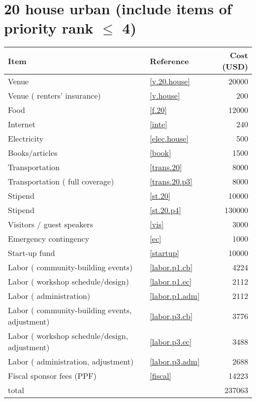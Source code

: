 \section*{20 house urban (include items of priority rank $\leq$ 4)}
\begin{center}
\begin{tabular}{llr}
Item & Reference & Cost (USD) \\ \hline
Venue & \ref{v.20.house} & 20000 \\
Venue ( renters' insurance) & \ref{v.house} & 200 \\
Food & \ref{f.20} & 12000 \\
Internet & \ref{inte} & 240 \\
Electricity & \ref{elec.house} & 500 \\
Books/articles & \ref{book} & 1500 \\
Transportation & \ref{trans.20} & 8000 \\
Transportation ( full coverage) & \ref{trans.20.p3} & 8000 \\
Stipend & \ref{st.20} & 10000 \\
Stipend & \ref{st.20.p4} & 130000 \\
Visitors / guest speakers & \ref{vis} & 3000 \\
Emergency contingency & \ref{ec} & 1000 \\
Start-up fund & \ref{startup} & 10000 \\
Labor ( community-building events) & \ref{labor.p1.cb} & 4224 \\
Labor ( workshop schedule/design) & \ref{labor.p1.ec} & 2112 \\
Labor ( administration) & \ref{labor.p1.adm} & 2112 \\
Labor ( community-building events, adjustment) & \ref{labor.p3.cb} & 3776 \\
Labor ( workshop schedule/design, adjustment) & \ref{labor.p3.ec} & 3488 \\
Labor ( administration, adjustment) & \ref{labor.p3.adm} & 2688 \\
Fiscal sponsor fees (PPF) & \ref{fiscal} & 14223 \\ \hline
total &  & 237063
\end{tabular}
\end{center}
